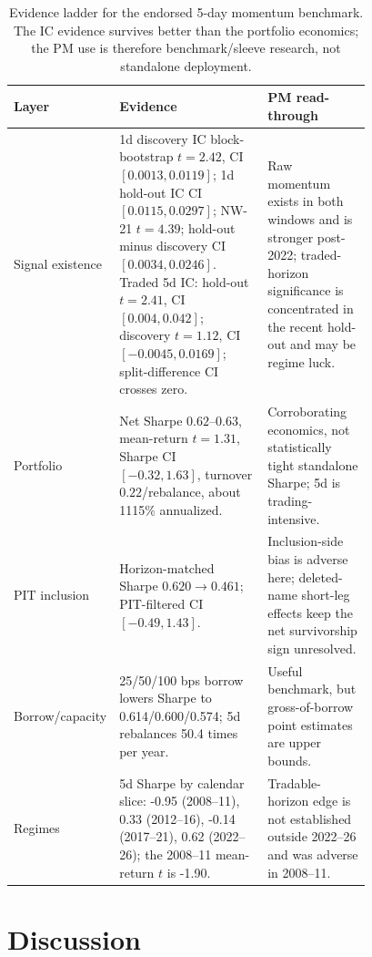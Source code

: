 \documentclass[9pt]{extarticle}
\begin{document}
\begin{table}[t]
  \centering
  \caption{Evidence ladder for the endorsed 5-day momentum benchmark. The IC
  evidence survives better than the portfolio economics; the PM use is therefore
  benchmark/sleeve research, not standalone deployment.}\label{tab:momentum_ladder}
  \scriptsize
  \setlength{\tabcolsep}{3pt}
  \begin{tabular}{lp{0.47\linewidth}p{0.31\linewidth}}
    \toprule
    Layer & Evidence & PM read-through \\
    \midrule
    Signal existence & 1d discovery IC block-bootstrap $t=2.42$, CI
      $[0.0013,0.0119]$; 1d hold-out IC CI $[0.0115,0.0297]$; NW-21 $t=4.39$;
      hold-out minus discovery CI $[0.0034,0.0246]$.
      Traded 5d IC: hold-out $t=2.41$, CI $[0.004,0.042]$; discovery $t=1.12$,
      CI $[-0.0045,0.0169]$; split-difference CI crosses zero. &
      Raw momentum exists in both windows and is stronger post-2022; traded-horizon significance is concentrated in the recent hold-out and may be regime luck. \\
    Portfolio & Net Sharpe $0.62$--$0.63$, mean-return $t=1.31$,
      Sharpe CI $[-0.32,1.63]$, turnover $0.22$/rebalance, about 1115\% annualized. &
      Corroborating economics, not statistically tight standalone Sharpe; 5d is trading-intensive. \\
    PIT inclusion & Horizon-matched Sharpe $0.620\rightarrow0.461$;
      PIT-filtered CI $[-0.49,1.43]$. &
      Inclusion-side bias is adverse here; deleted-name short-leg effects keep the net survivorship sign unresolved. \\
    Borrow/capacity & 25/50/100 bps borrow lowers Sharpe to
      0.614/0.600/0.574; 5d rebalances 50.4 times per year. &
      Useful benchmark, but gross-of-borrow point estimates are upper bounds. \\
    Regimes & 5d Sharpe by calendar slice: -0.95 (2008--11), 0.33
      (2012--16), -0.14 (2017--21), 0.62 (2022--26); the 2008--11 mean-return
      $t$ is -1.90. &
      Tradable-horizon edge is not established outside 2022--26 and was adverse in 2008--11. \\
    \bottomrule
  \end{tabular}
\end{table}

\section{Discussion}
\label{sec:discussion}
\end{document}

